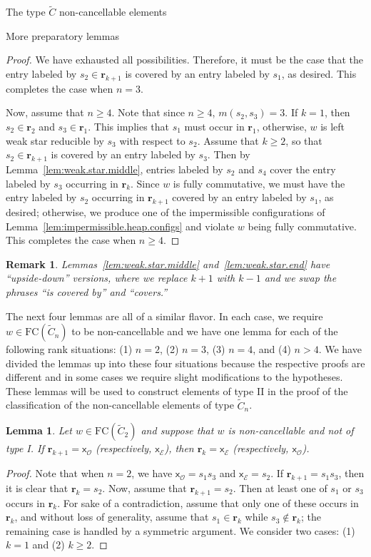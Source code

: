 \documentclass[12pt]{amsart}
\newtheorem{lem}[thm]{Lemma}
\newtheorem{rem}[thm]{Remark}
\newcommand{\C}{\widetilde{C}}
\renewcommand{\O}{\mathcal{O}}
\newcommand{\E}{\mathcal{E}}
\newcommand{\x}{\mathsf{x}}
\renewcommand{\(}{\left(}
\renewcommand{\)}{\right)}
\newcommand{\FC}{\mathrm{FC}}
\renewcommand{\r}{\mathbf{r}}
\begin{document}
\begin{section}{The type $\C$ non-cancellable elements}
\begin{subsection}{More preparatory lemmas}
\begin{proof}
We have exhausted all possibilities.  Therefore, it must be the case that the entry labeled by $s_{2} \in \r_{k+1}$ is covered by an entry labeled by $s_{1}$, as desired.  This completes the case when $n=3$.

Now, assume that $n\geq 4$.  Note that since $n\geq 4$, $m(s_{2},s_{3})=3$.  If $k=1$, then $s_{2} \in \r_{2}$ and $s_{3} \in \r_{1}$.    This implies that $s_{1}$ must occur in $\r_{1}$, otherwise, $w$ is left weak star reducible by $s_{3}$ with respect to $s_{2}$.  Assume that $k \geq 2$, so that $s_{2} \in \r_{k+1}$ is covered by an entry labeled by $s_{3}$.  Then by Lemma~\ref{lem:weak.star.middle}, entries labeled by $s_{2}$ and $s_{4}$ cover the entry labeled by $s_{3}$ occurring in $\r_{k}$.  Since $w$ is fully commutative, we must have the entry labeled by $s_{2}$ occurring in $\r_{k+1}$ covered by an entry labeled by $s_{1}$, as desired; otherwise, we produce one of the impermissible configurations of Lemma~\ref{lem:impermissible.heap.configs} and violate $w$ being fully commutative.  This completes the case when $n\geq 4$.
\end{proof}

\begin{rem}
Lemmas~\ref{lem:weak.star.middle} and~\ref{lem:weak.star.end} have ``upside-down'' versions, where we replace $k+1$ with $k-1$ and we swap the phrases ``is covered by'' and ``covers.'' 
\end{rem}

The next four lemmas are all of a similar flavor.  In each case, we require $w \in \FC(\C_n)$ to be non-cancellable and we have one lemma for each of the following rank situations: (1) $n=2$, (2) $n=3$, (3) $n=4$, and (4) $n>4$.  We have divided the lemmas up into these four situations because the respective proofs are different and in some cases we require slight modifications to the hypotheses.  These lemmas will be used to construct elements of type II in the proof of the classification of the non-cancellable elements of type $\C_n$.

\begin{lem}\label{lem:sandwich.stack.n=2}
Let $w \in \FC(\C_{2})$ and suppose that $w$ is non-cancellable and not of type I.  If $\r_{k+1}=\x_{\O}$ (respectively, $\x_{\E}$), then $\r_{k}=\x_{\E}$ (respectively, $\x_{\O}$).
\end{lem}

\begin{proof}
Note that when $n=2$, we have $\x_{\O}=s_{1}s_{3}$ and $\x_{\E}=s_{2}$.  If $\r_{k+1}=s_{1}s_{3}$, then it is clear that $\r_{k}=s_{2}$.  Now, assume that $\r_{k+1}=s_{2}$.  Then at least one of $s_{1}$ or $s_{3}$ occurs in $\r_{k}$.  For sake of a contradiction, assume that only one of these occurs in $\r_{k}$, and without loss of generality, assume that $s_{1} \in \r_{k}$ while $s_{3} \notin \r_{k}$; the remaining case is handled by a symmetric argument.  We consider two cases: (1) $k=1$ and (2) $k \geq 2$.


\end{proof}
\end{subsection}
\end{section}
\end{document}
